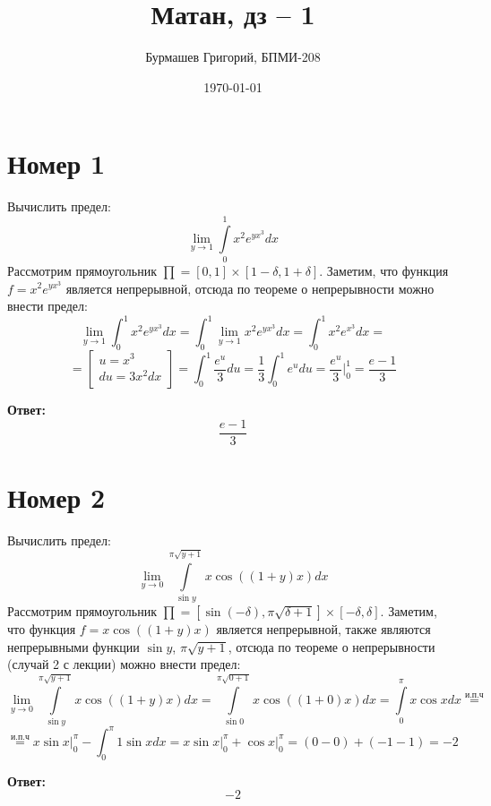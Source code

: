 \documentclass[a4paper,12pt]{article}
\author{Бурмашев Григорий, БПМИ-208}
\title{Матан, дз -- 1}
\date{\today}
\begin{document}
\maketitle

\section*{Номер 1}
Вычислить предел:
\[
\lim_{y \rightarrow 1} \int\limits_0^1 x^2 e^{yx^3} dx
\]
Рассмотрим прямоугольник $\prod = [0,1 ] \times [1 -\delta, 1 + \delta]$. Заметим, что функция $f = x^2 e^{yx^3}$ является непрерывной, отсюда по теореме о непрерывности можно внести предел:
\[
\lim_{y \rightarrow 1} \int_0^1 x^2 e^{yx^3} dx = 
\int_0^1  \lim_{y \rightarrow 1} x^2 e^{yx^3} dx =
\int_0^1  x^2 e^{x^3} dx =
\]
\[
=
\begin{bmatrix}
u = x^3 \\
du = 3x^2 dx \\
\end{bmatrix} 
=
\int_0^1 \frac{e^u}{3} du  =
\frac13 \int_0^1 e^u du  =
\frac{e^u}{3} \Bigg|^1_0 = \frac{e - 1}{3}
\]
\begin{center}
\textbf{Ответ: }
\[
\frac{e-1}{3}
\]
\end{center}
\clearpage

\section*{Номер 2}
Вычислить предел:
\[
\lim_{y \rightarrow 0} \int\limits_{\sin y}^{\pi \sqrt{y + 1}} x \cos ((1 + y)x)dx
\]
Рассмотрим прямоугольник $\prod = [\sin (-\delta), \pi \sqrt{\delta + 1} ] \times [-\delta, \delta]$. Заметим, что функция $f = x \cos ((1 + y)x)$ является непрерывной, также являются непрерывными функции $\sin y$, $\pi \sqrt{y + 1}$, отсюда по теореме о непрерывности (случай 2 с лекции) можно внести предел:
\[
\lim_{y \rightarrow 0} \int\limits_{\sin y}^{\pi \sqrt{y + 1}} x \cos ((1 + y)x)dx =
\int\limits_{\sin 0}^{\pi \sqrt{0 + 1}} x \cos ((1 + 0)x)dx  =
\int\limits_0^{\pi} x \cos x dx \overset{\text{и.п.ч}}{=}
\]
\[
\overset{\text{и.п.ч}}{=}
 x \sin x \Big|^{\pi}_{0} - \int_0^{\pi} 1 \sin x dx =  x \sin x \Big|^{\pi}_{0} + \cos x \Big|^{\pi}_{0}  = (0 - 0) + (-1 -1) = -2
\]
\begin{center}
\textbf{Ответ: } 
\[
-2
\]
\end{center}
\clearpage
\end{document}
